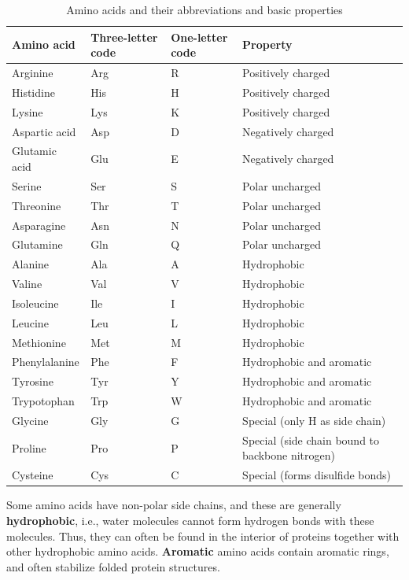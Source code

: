 \begin{table}
\centering
\caption[]{Amino acids and their abbreviations and basic properties}
\label{aminoacidtable}
\begin{tabular}{p{}p{}p{}p{}}
\toprule
Amino acid & Three-letter code & One-letter code & Property \\
\hline
Arginine & Arg & R & Positively charged \\
Histidine & His & H & Positively charged \\
Lysine & Lys & K & Positively charged \\
Aspartic acid & Asp & D & Negatively charged \\
Glutamic acid & Glu & E & Negatively charged \\
Serine & Ser & S & Polar uncharged \\
Threonine & Thr & T & Polar uncharged \\
Asparagine & Asn & N & Polar uncharged \\
Glutamine & Gln & Q & Polar uncharged \\
Alanine & Ala & A & Hydrophobic \\
Valine & Val & V & Hydrophobic \\
Isoleucine & Ile & I & Hydrophobic \\
Leucine & Leu & L & Hydrophobic \\
Methionine & Met & M & Hydrophobic \\
Phenylalanine & Phe & F & Hydrophobic and aromatic \\
Tyrosine & Tyr & Y & Hydrophobic and aromatic \\
Trypotophan & Trp & W & Hydrophobic and aromatic \\
Glycine & Gly & G & Special (only H as side chain) \\
Proline & Pro & P & Special (side chain bound to backbone nitrogen) \\
Cysteine & Cys & C & Special (forms disulfide bonds) \\
\bottomrule
\end{tabular}
\end{table}

Some amino acids have non-polar side chains, and these are generally \textbf{hydrophobic}, i.e., water molecules cannot form hydrogen bonds with these molecules.
Thus, they can often be found in the interior of proteins together with other hydrophobic amino acids.
\textbf{Aromatic} amino acids contain aromatic rings, and often stabilize folded protein structures.

